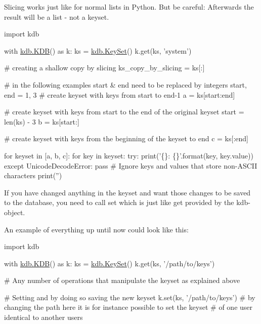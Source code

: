 Slicing works just like for normal lists in Python. But be careful\+: Afterwards the result will be a list -\/ not a keyset.


\begin{DoxyCode}
\textcolor{keyword}{import} kdb

with \hyperlink{classkdb_1_1KDB}{kdb.KDB}() \textcolor{keyword}{as} k:
    ks = \hyperlink{classkdb_1_1KeySet}{kdb.KeySet}()
    k.get(ks, \textcolor{stringliteral}{'system'})

    \textcolor{comment}{# creating a shallow copy by slicing}
    ks\_copy\_by\_slicing = ks[:]

    \textcolor{comment}{# in the following examples start & end need to be replaced by integers}
    start, end = 1, 3
    \textcolor{comment}{# create keyset with keys from start to end-1}
    a = ks[start:end]

    \textcolor{comment}{# create keyset with keys from start to the end of the original keyset}
    start = len(ks) - 3
    b = ks[start:]

    \textcolor{comment}{# create keyset with keys from the beginning of the keyset to end}
    c = ks[:end]

    \textcolor{keywordflow}{for} keyset \textcolor{keywordflow}{in} [a, b, c]:
        \textcolor{keywordflow}{for} key \textcolor{keywordflow}{in} keyset:
            \textcolor{keywordflow}{try}:
                print(\textcolor{stringliteral}{'\{\}: \{\}'}.format(key, key.value))
            \textcolor{keywordflow}{except} UnicodeDecodeError:
                \textcolor{keywordflow}{pass}  \textcolor{comment}{# Ignore keys and values that store non-ASCII characters}
        print(\textcolor{stringliteral}{''})
\end{DoxyCode}


If you have changed anything in the keyset and want those changes to be saved to the database, you need to call {\ttfamily set} which is just like {\ttfamily get} provided by the kdb-\/object.

An example of everything up until now could look like this\+:


\begin{DoxyCode}
\textcolor{keyword}{import} kdb

with \hyperlink{classkdb_1_1KDB}{kdb.KDB}() \textcolor{keyword}{as} k:
    ks = \hyperlink{classkdb_1_1KeySet}{kdb.KeySet}()
    k.get(ks, \textcolor{stringliteral}{'/path/to/keys'})

    \textcolor{comment}{# Any number of operations that manipulate the keyset as explained above}

    \textcolor{comment}{# Setting and by doing so saving the new keyset}
    k.set(ks, \textcolor{stringliteral}{'/path/to/keys'})
    \textcolor{comment}{# by changing the path here it is for instance possible to set the keyset}
    \textcolor{comment}{# of one user identical to another users}
\end{DoxyCode}


